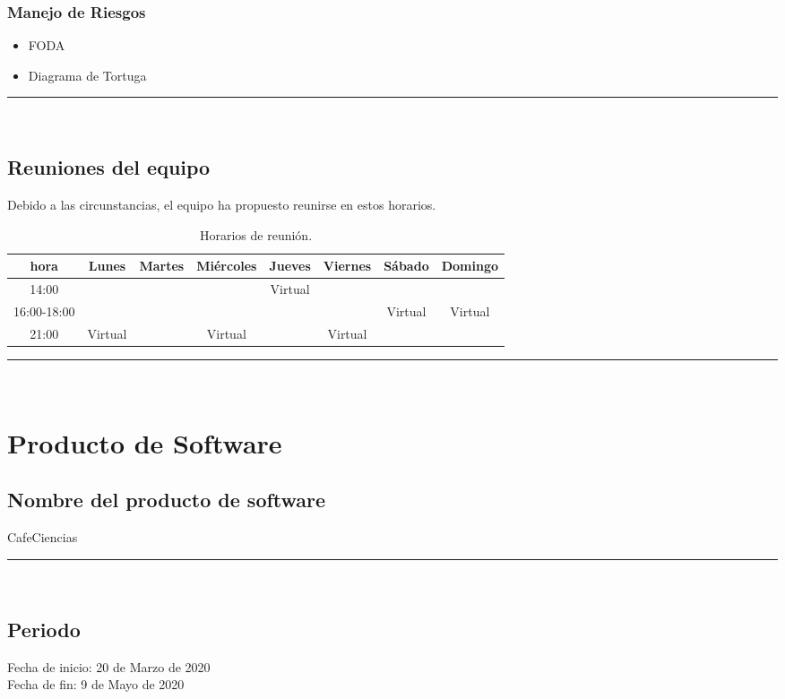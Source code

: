 \documentclass{article}
\begin{document}
\subsubsection*{Manejo de Riesgos}
\begin{itemize}
\item FODA
\item Diagrama de Tortuga
\end{itemize}

\rule{0.8\textwidth}{.8pt}\\

\subsection*{Reuniones del equipo}

Debido a las circunstancias, el equipo ha propuesto reunirse en estos horarios.
\begin{center}
  \begin{table}[H]
    \centering
    \begin{tabular}{| c | c | c | c | c | c | c | c | }
      \hline
      hora & Lunes & Martes & Miércoles & Jueves & Viernes & Sábado & Domingo \\
      \hline
      14:00 & & & & Virtual & & & \\ \hline
      16:00-18:00 & & & & &  & Virtual & Virtual  \\ \hline
      21:00 & Virtual & & Virtual & & Virtual & & \\ \hline
    \end{tabular}
    \caption{Horarios de reunión.}
    \label{tabla:horarios}
  \end{table}
\end{center}

\rule{0.8\textwidth}{.8pt}\\

\section*{Producto de Software}

\subsection*{Nombre del producto de software}
CafeCiencias\\

\rule{0.8\textwidth}{.8pt}\\

\subsection*{Periodo}
Fecha de inicio: 20 de Marzo de 2020\\
\indent Fecha de fin: 9 de Mayo de 2020\\
\end{document}
